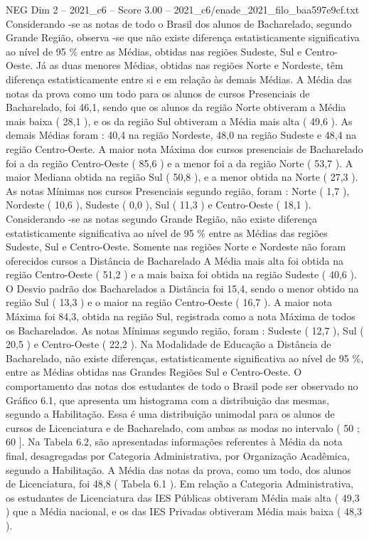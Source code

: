 \begin{textsample}{NEG Dim 2 – 2021\_c6 – Score 3.00 – 2021\_c6/enade\_2021\_filo\_baa597e9cf.txt}
Considerando -se as notas de todo o Brasil dos alunos de Bacharelado, segundo Grande Região, observa -se que não existe diferença estatisticamente significativa ao nível de 95 \% entre as Médias, obtidas nas regiões Sudeste, Sul e Centro-Oeste.
Já as duas menores Médias, obtidas nas regiões Norte e Nordeste, têm diferença estatisticamente entre si e em relação às demais Médias.
A Média das notas da prova como um todo para os alunos de cursos Presenciais de Bacharelado, foi 46,1, sendo que os alunos da região Norte obtiveram a Média mais baixa ( 28,1 ), e os da região Sul obtiveram a Média mais alta ( 49,6 ).
As demais Médias foram : 40,4 na região Nordeste, 48,0 na região Sudeste e 48,4 na região Centro-Oeste.
A maior nota Máxima dos cursos presenciais de Bacharelado foi a da região Centro-Oeste ( 85,6 ) e a menor foi a da região Norte ( 53,7 ).
A maior Mediana obtida na região Sul ( 50,8 ), e a menor obtida na Norte ( 27,3 ).
As notas Mínimas nos cursos Presenciais segundo região, foram : Norte ( 1,7 ), Nordeste ( 10,6 ), Sudeste ( 0,0 ), Sul ( 11,3 ) e Centro-Oeste ( 18,1 ).
Considerando -se as notas segundo Grande Região, não existe diferença estatisticamente significativa ao nível de 95 \% entre as Médias das regiões Sudeste, Sul e Centro-Oeste.
Somente nas regiões Norte e Nordeste não foram oferecidos cursos a Distância de Bacharelado A Média mais alta foi obtida na região Centro-Oeste ( 51,2 ) e a mais baixa foi obtida na região Sudeste ( 40,6 ).
O Desvio padrão dos Bacharelados a Distância foi 15,4, sendo o menor obtido na região Sul ( 13,3 ) e o maior na região Centro-Oeste ( 16,7 ).
A maior nota Máxima foi 84,3, obtida na região Sul, registrada como a nota Máxima de todos os Bacharelados.
As notas Mínimas segundo região, foram : Sudeste ( 12,7 ), Sul ( 20,5 ) e Centro-Oeste ( 22,2 ).
Na Modalidade de Educação a Distância de Bacharelado, não existe diferenças, estatisticamente significativa ao nível de 95 \%, entre as Médias obtidas nas Grandes Regiões Sul e Centro-Oeste.
O comportamento das notas dos estudantes de todo o Brasil pode ser observado no Gráfico 6.1, que apresenta um histograma com a distribuição das mesmas, segundo a Habilitação.
Essa é uma distribuição unimodal para os alunos de cursos de Licenciatura e de Bacharelado, com ambas as modas no intervalo ( 50 ; 60 ].
Na Tabela 6.2, são apresentadas informações referentes à Média da nota final, desagregadas por Categoria Administrativa, por Organização Acadêmica, segundo a Habilitação.
A Média das notas da prova, como um todo, dos alunos de Licenciatura, foi 48,8 ( Tabela 6.1 ).
Em relação a Categoria Administrativa, os estudantes de Licenciatura das IES Públicas obtiveram Média mais alta ( 49,3 ) que a Média nacional, e os das IES Privadas obtiveram Média mais baixa ( 48,3 ).

\end{textsample}
